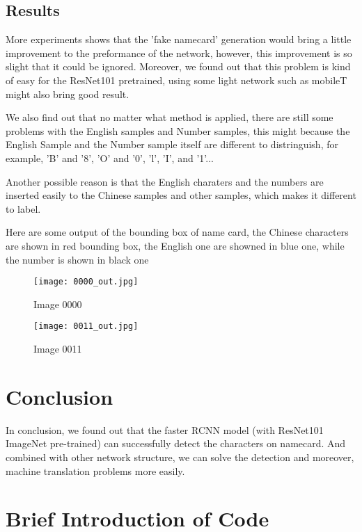 \documentclass{IEEEtran}
\begin{document}
\subsection{Results}
More experiments shows that the 'fake namecard' generation would bring a little improvement to the preformance of 
the network, however, this improvement is so slight that it could be ignored. Moreover, we found out that this 
problem is kind of easy for the ResNet101 pretrained, using some light network such as mobileT might also bring 
good result.

We also find out that no matter what method is applied, there are still some problems with the English samples and Number samples, this might because the English Sample and the Number sample itself are different to distringuish, for example, 'B' and '8', 'O' and '0', 'l', 'I', and '1'...

Another possible reason is that the English charaters and the numbers are inserted easily to the Chinese samples and other samples, which makes it different to label.

Here are some output of the bounding box of name card, the Chinese characters are shown in red bounding box, 
the English one are showned in blue one, while the number is shown in black one

\begin{figure}[h]
    \centering
    \texttt{[image: 0000\_out.jpg]}
    \caption{Image 0000}
\end{figure}

\begin{figure}[h]
    \centering
    \texttt{[image: 0011\_out.jpg]}
    \caption{Image 0011}
\end{figure}

\section{Conclusion}

In conclusion, we found out that the faster RCNN model (with ResNet101 ImageNet pre-trained) can successfully detect the characters on namecard. And combined with other network structure, we can solve the detection and moreover, machine translation problems more easily.

\section{Brief Introduction of Code}
\end{document}
